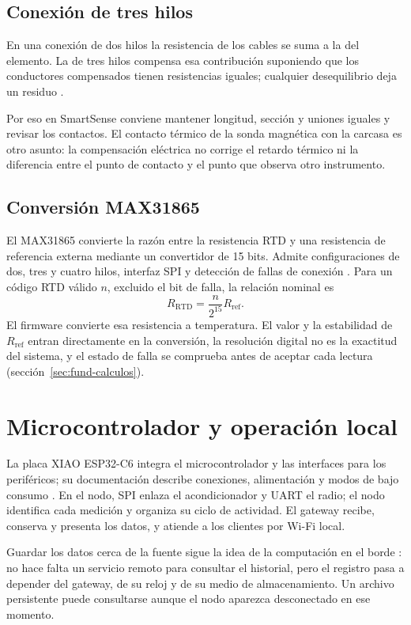 \subsection{Conexión de tres hilos}
En una conexión de dos hilos la resistencia de los cables se suma a la del elemento. La de tres hilos compensa esa contribución suponiendo que los conductores compensados tienen resistencias iguales; cualquier desequilibrio deja un residuo \citep{max31865}.

Por eso en SmartSense conviene mantener longitud, sección y uniones iguales y revisar los contactos. El contacto térmico de la sonda magnética con la carcasa es otro asunto: la compensación eléctrica no corrige el retardo térmico ni la diferencia entre el punto de contacto y el punto que observa otro instrumento.

\subsection{Conversión MAX31865}
El MAX31865 convierte la razón entre la resistencia RTD y una resistencia de referencia externa mediante un convertidor de 15 bits. Admite configuraciones de dos, tres y cuatro hilos, interfaz SPI y detección de fallas de conexión \citep{max31865}. Para un código RTD válido $n$, excluido el bit de falla, la relación nominal es
\begin{equation}
R_{\mathrm{RTD}}=\frac{n}{2^{15}}R_{\mathrm{ref}}.
\label{eq:marco-rtd-digital}
\end{equation}
El firmware convierte esa resistencia a temperatura. El valor y la estabilidad de $R_{\mathrm{ref}}$ entran directamente en la conversión, la resolución digital no es la exactitud del sistema, y el estado de falla se comprueba antes de aceptar cada lectura (sección~\ref{sec:fund-calculos}).

\section{Microcontrolador y operación local}
La placa XIAO ESP32-C6 integra el microcontrolador y las interfaces para los periféricos; su documentación describe conexiones, alimentación y modos de bajo consumo \citep{xiaoc6}. En el nodo, SPI enlaza el acondicionador y UART el radio; el nodo identifica cada medición y organiza su ciclo de actividad. El gateway recibe, conserva y presenta los datos, y atiende a los clientes por Wi-Fi local.

Guardar los datos cerca de la fuente sigue la idea de la computación en el borde \citep{shi2016}: no hace falta un servicio remoto para consultar el historial, pero el registro pasa a depender del gateway, de su reloj y de su medio de almacenamiento. Un archivo persistente puede consultarse aunque el nodo aparezca desconectado en ese momento.

